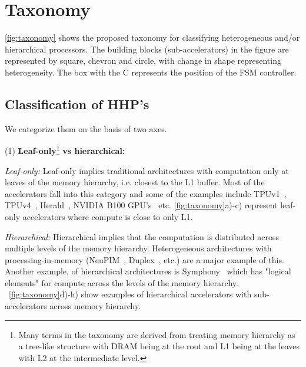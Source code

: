 



\section{\HHPName Taxonomy}
\label{sec:taxonomy}


\autoref{fig:taxonomy} shows the proposed \HHPName taxonomy for classifying heterogeneous and/or hierarchical processors. The building blocks (sub-accelerators) in the figure are represented by square, chevron and circle, with change in shape representing heterogeneity. The box with the C represents the position of the FSM controller.



\subsection{Classification of HHP's}

We categorize them on the basis of two axes.

(1) \textbf{Leaf-only}\footnote{Many terms in the taxonomy are derived from treating memory hierarchy as a tree-like structure with DRAM being at the root and L1 being at the leaves with L2 at the intermediate level.}\textbf{ vs hierarchical:
}

\textit{Leaf-only:} Leaf-only implies traditional architectures with computation only at leaves of the memory hierarchy, i.e. closest to the L1 buffer.  Most of the accelerators fall into this category and some of the examples include TPUv1~\cite{tpu-isca}, TPUv4~\cite{tpuv4}, Herald~\cite{kwon2021heterogeneous}, NVIDIA B100 GPU's~\cite{blackwell} etc. \autoref{fig:taxonomy}a)-c) represent leaf-only accelerators where compute is close to only L1.

\textit{Hierarchical:} Hierarchical implies that the computation is distributed across multiple levels of the memory hierarchy. Heterogeneous architectures with processing-in-memory (NeuPIM~\cite{neupim}, Duplex~\cite{duplex}, etc.) are a major example of this. Another example, of hierarchical architectures is Symphony~\cite{symphony} which has "logical elements" for compute across the levels of the memory hierarchy. ~\autoref{fig:taxonomy}d)-h) show examples of hierarchical accelerators with sub-accelerators across memory hierarchy.

